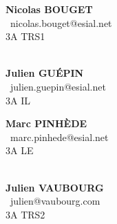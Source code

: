 \documentclass[12pt]{article}
\begin{document}
\thispagestyle{empty}

\begin{multicols}{2}
{\large
	\begin{flushleft}
		\noindent{}\textbf{Nicolas BOUGET}\\
		\Letter~nicolas.bouget@esial.net\\
		3A TRS1\\~

		\noindent{}\textbf{Julien GUÉPIN}\\
		\Letter~julien.guepin@esial.net\\
		3A IL\\
	\end{flushleft}

	\begin{flushright}
		\noindent{}\textbf{Marc PINHÈDE}\\
		\Letter~marc.pinhede@esial.net\\
		3A LE\\~

		\noindent{}\textbf{Julien VAUBOURG}\\
		\Letter~julien@vaubourg.com\\
		3A TRS2\\
	\end{flushright}
}
\end{multicols}

\vspace{0.5cm}
\end{document}
